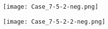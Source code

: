 \begin{frame}
\centering
\texttt{[image: Case\_7-5-2-neg.png]}
\end{frame}
\begin{frame}
\centering
\texttt{[image: Case\_7-5-2-2-neg.png]}
\end{frame}
